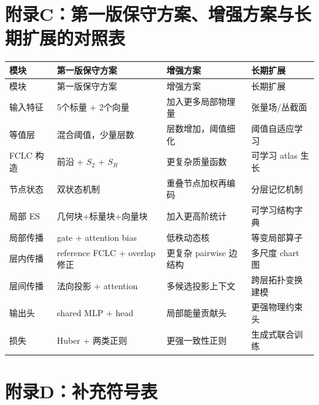 \documentclass[12pt,a4paper]{ctexart}
\begin{document}
\section{附录C：第一版保守方案、增强方案与长期扩展的对照表}

\begin{longtable}{p{3.2cm}p{4.2cm}p{4.2cm}p{3.2cm}}
\toprule
模块 & 第一版保守方案 & 增强方案 & 长期扩展 \\
\midrule
\endfirsthead
\toprule
模块 & 第一版保守方案 & 增强方案 & 长期扩展 \\
\midrule
\endhead
\bottomrule
\endfoot

输入特征 &
5个标量 + 2个向量 &
加入更多局部物理量 &
张量场/丛截面 \\

等值层 &
混合阈值，少量层数 &
层数增加，阈值细化 &
阈值自适应学习 \\

FCLC 构造 &
前沿 + \(S_2\) + \(S_R\) &
更复杂质量函数 &
可学习 atlas 生长 \\

节点状态 &
双状态机制 &
重叠节点加权再编码 &
分层记忆机制 \\

局部 ES &
几何块+标量块+向量块 &
加入更高阶统计 &
可学习结构字典 \\

局部传播 &
gate + attention bias &
低秩动态核 &
等变局部算子 \\

层内传播 &
reference FCLC + overlap 修正 &
更复杂 pairwise 边结构 &
多尺度 chart 图 \\

层间传播 &
法向投影 + attention &
多候选投影上下文 &
跨层拓扑变换建模 \\

输出头 &
shared MLP + head &
局部能量贡献头 &
更强物理约束头 \\

损失 &
Huber + 两类正则 &
更强一致性正则 &
生成式联合训练 \\
\end{longtable}

\section{附录D：补充符号表}
\end{document}
